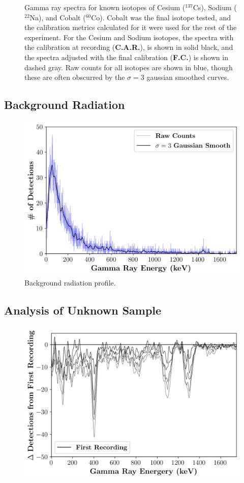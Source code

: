 \documentclass[a4paper,twocolumn]{IEEEtran}
\begin{document}
\begin{figure}[H]
        \caption{Gamma ray spectra for known isotopes of Cesium ($^{137}$Cs), Sodium ($^{22}$Na), and Cobalt ($^{60}$Co). Cobalt was the final isotope tested, and the calibration metrics calculated for it were used for the rest of the experiment. For the Cesium and Sodium isotopes, the spectra with the calibration at recording (\textbf{C.A.R.}), is shown in solid black, and the spectra adjusted with the final calibration (\textbf{F.C.}) is shown in dashed gray. Raw counts for all isotopes are shown in blue, though these are often obscurred by the $\sigma=3$ gaussian smoothed curves.}
    \end{figure}
    \subsection{Background Radiation}
    \begin{figure}[H]
        \centering
        \includegraphics[width=0.95\linewidth]{figures/background_counts_overlay.png}
        \caption{Background radiation profile.}
    \end{figure}
    \subsection{Analysis of Unknown Sample}
    \begin{figure}[H]
        \centering
        \includegraphics[width=0.95\linewidth]{figures/difference_counts_smooth.png}
    \end{figure}
\end{document}

